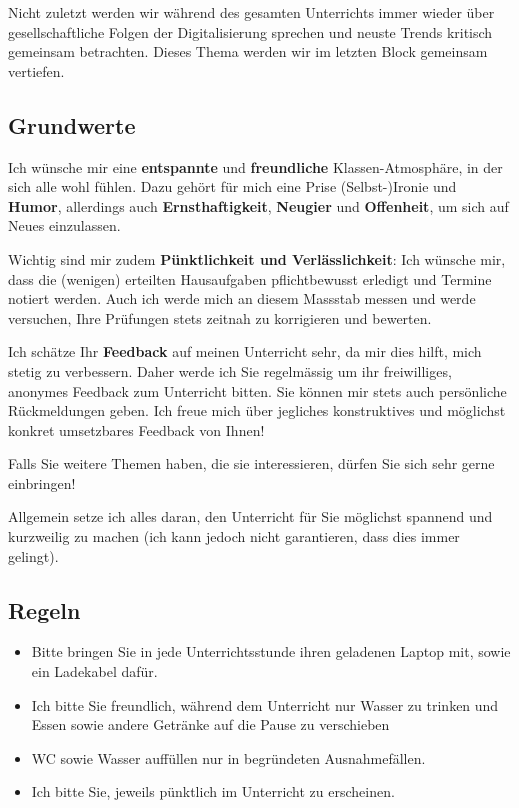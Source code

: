 Nicht zuletzt werden wir während des gesamten Unterrichts immer wieder über gesellschaftliche Folgen der Digitalisierung sprechen und neuste Trends kritisch gemeinsam betrachten. Dieses Thema werden wir im letzten Block gemeinsam vertiefen.


\subsection*{Grundwerte}
Ich wünsche mir eine \textbf{entspannte} und \textbf{freundliche} Klassen-Atmosphäre, in der sich alle wohl fühlen. Dazu gehört für mich eine Prise (Selbst-)Ironie und \textbf{Humor}, allerdings auch \textbf{Ernsthaftigkeit}, \textbf{Neugier} und \textbf{Offenheit}, um sich auf Neues einzulassen. 

Wichtig sind mir zudem \textbf{Pünktlichkeit und Verlässlichkeit}: Ich wünsche mir, dass die (wenigen) erteilten Hausaufgaben pflichtbewusst erledigt und Termine notiert werden. Auch ich werde mich an diesem Massstab messen und werde versuchen, Ihre Prüfungen stets zeitnah zu korrigieren und bewerten.

Ich schätze Ihr \textbf{Feedback} auf meinen Unterricht sehr, da mir dies hilft, mich stetig zu verbessern. Daher werde ich Sie regelmässig um ihr freiwilliges, anonymes Feedback zum Unterricht bitten. Sie können mir stets auch persönliche Rückmeldungen geben. Ich freue mich über jegliches konstruktives und möglichst konkret umsetzbares Feedback von Ihnen!

Falls Sie weitere Themen haben, die sie interessieren, dürfen Sie sich sehr gerne einbringen!

Allgemein setze ich alles daran, den Unterricht für Sie möglichst spannend und kurzweilig zu machen (ich kann jedoch nicht garantieren, dass dies immer gelingt).

\subsection*{Regeln}

\begin{itemize}
	\item Bitte bringen Sie in jede Unterrichtsstunde ihren geladenen Laptop mit, sowie ein Ladekabel dafür. 
	\item Ich bitte Sie freundlich, während dem Unterricht nur Wasser zu trinken und Essen sowie andere Getränke auf die Pause zu verschieben
	\item WC sowie Wasser auffüllen nur in begründeten Ausnahmefällen.
	\item Ich bitte Sie, jeweils pünktlich im Unterricht zu erscheinen.
\end{itemize}